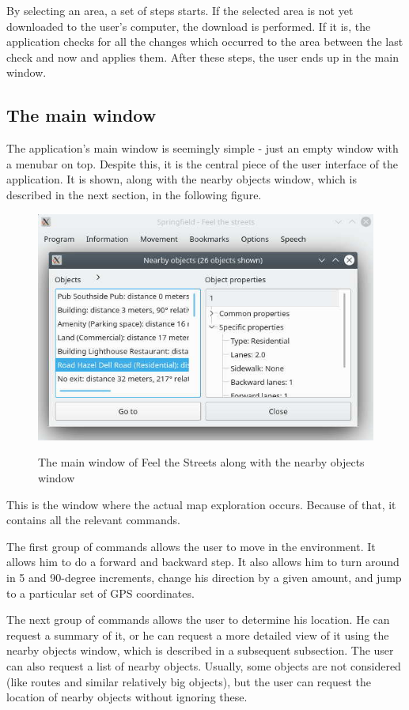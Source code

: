 \documentclass[nolof,digital]{fithesis3}
\begin{document}
By selecting an area, a set of steps starts. If the selected area is not yet downloaded to the user's computer, the download is performed. If it is, the application checks for all the changes which occurred to the area between the last check and now and applies them. After these steps, the user ends up in the main window.
\subsection{The main window}

The application's main window is seemingly simple - just an empty window with a menubar on top. Despite this, it is the central piece of the user interface of the application. It is shown, along with the nearby objects window, which is described in the next section, in the following figure.
\begin{figure}[h]
\caption{The main window of Feel the Streets along with the nearby objects window}
\includegraphics{feel-the-streets}
\label{fig:fts}
\end{figure}

This is the window where the actual map exploration occurs. Because of that, it contains all the relevant commands.

The first group of commands allows the user to move in the environment. It allows him to do a forward and backward step. It also allows him to turn around in 5 and 90-degree increments, change his direction by a given amount, and jump to a particular set of GPS coordinates.

The next group of commands allows the user to determine his location. He can request a summary of it, or he can request a more detailed view of it using the nearby objects window, which is described in a subsequent subsection. The user can also request a list of nearby objects. Usually, some objects are not considered (like routes and similar relatively big objects), but the user can request the location of nearby objects without ignoring these.
\end{document}
